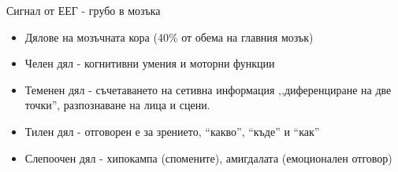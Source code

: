 \documentclass[9pt]{beamer}
\begin{document}
    \begin{frame}[t]{Сигнал от ЕЕГ - грубо в мозъка}
        \begin{itemize}
            \setlength\itemsep{\fill}
            \pause
            \item Дялове на мозъчната кора (40\% от обема на главния мозък)
            \pause
            \item Челен дял
            \pause - когнитивни умения и моторни функции
            \pause
            \item Теменен дял
            \pause - съчетаването на сетивна информация ,,диференциране на две точки'', разпознаване на лица и сцени.
            \pause
            \item Тилен дял
            \pause - отговорен е за зрението, ``какво'', ``къде'' и ``как''
            \pause    
            \item Слепоочен дял
            \pause - хипокампа (спомените), амигдалата (емоционален отговор)
        \end{itemize}
    \end{frame}
\end{document}
